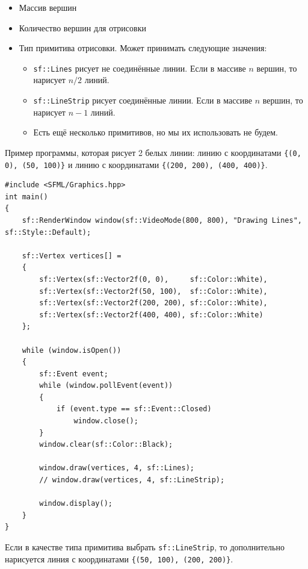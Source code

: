 \documentclass{article}
\begin{document}
\begin{itemize}
\item Массив вершин
\item Количество вершин для отрисовки
\item Тип примитива отрисовки. Может принимать следующие значения:
\begin{itemize}
\item \texttt{sf::Lines} рисует не соединённые линии.
Если в массиве $n$ вершин, то нарисует $n / 2$ линий.
\item \texttt{sf::LineStrip} рисует соединённые линии. 
Если в массиве $n$ вершин, то нарисует $n - 1$ линий.
\item Есть ещё несколько примитивов, но мы их использовать не будем.
\end{itemize}
\end{itemize}

Пример программы, которая рисует 2 белых линии: линию с координатами \texttt{\{(0, 0), (50, 100)\}} и линию с координатами \texttt{\{(200, 200), (400, 400)\}}.
\begin{lstlisting}
#include <SFML/Graphics.hpp>
int main()
{
    sf::RenderWindow window(sf::VideoMode(800, 800), "Drawing Lines", sf::Style::Default);
    
    sf::Vertex vertices[] =
    {
        sf::Vertex(sf::Vector2f(0, 0),     sf::Color::White),
        sf::Vertex(sf::Vector2f(50, 100),  sf::Color::White),
        sf::Vertex(sf::Vector2f(200, 200), sf::Color::White),
        sf::Vertex(sf::Vector2f(400, 400), sf::Color::White)
    };
    
    while (window.isOpen())
    {
        sf::Event event;
        while (window.pollEvent(event)) 
        {
            if (event.type == sf::Event::Closed)
                window.close();
        }
        window.clear(sf::Color::Black);
        
        window.draw(vertices, 4, sf::Lines);
        // window.draw(vertices, 4, sf::LineStrip);
        
        window.display();
    }
}
\end{lstlisting}
Если в качестве типа примитива выбрать \texttt{sf::LineStrip}, то дополнительно нарисуется линия с координатами \texttt{\{(50, 100), (200, 200)\}}.
\end{document}

